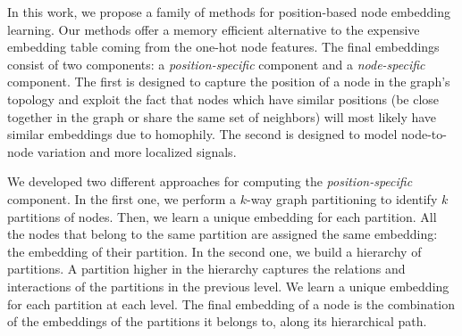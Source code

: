\documentclass[conference]{IEEEtran}
\begin{document}
In this work, we propose a family of methods for position-based node embedding learning. Our methods offer a memory efficient alternative to the expensive embedding table coming from the one-hot node features. 
% 
The final embeddings consist of two components: a \textit{position-specific} component and a \textit{node-specific} component. 
The first is designed to capture the position of a node in the graph's topology and exploit the fact that nodes which have similar positions (be close together in the graph or share the same set of neighbors) will most likely have similar embeddings due to homophily.
% 
The second is designed to model node-to-node variation and more localized signals.
 

We developed two different approaches for computing the \textit{position-specific} component. 
In the first one, we perform a $k$-way graph partitioning to identify $k$ partitions of nodes. Then, we learn a unique embedding for each partition. All the nodes that belong to the same partition are assigned the same embedding: the embedding of their partition. 
% 
In the second one, we build a hierarchy of partitions. 
A partition higher in the hierarchy captures the relations and interactions of the partitions in the previous level. 
% 
We learn a unique embedding for each partition at each level. The final embedding of a node is the combination of the embeddings of the partitions it belongs to, along its hierarchical path. 
\end{document}

